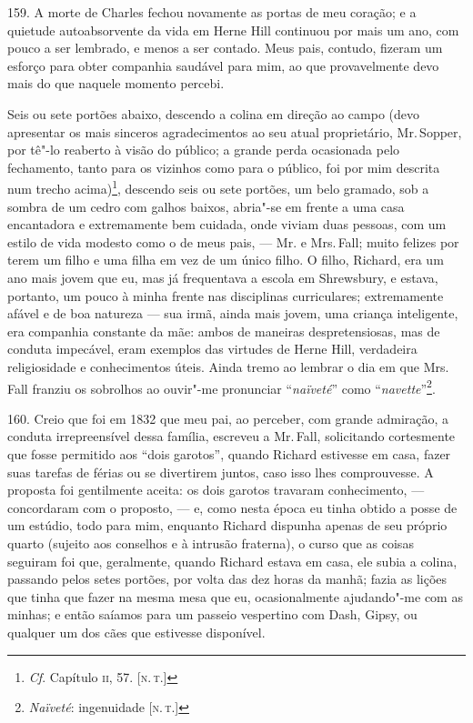 159. A morte de Charles fechou novamente as portas de meu coração; e a
quietude autoabsorvente da vida em Herne Hill continuou por mais um ano,
com pouco a ser lembrado, e menos a ser contado. Meus pais, contudo,
fizeram um esforço para obter companhia saudável para mim, ao que
provavelmente devo mais do que naquele momento percebi.

Seis ou sete portões abaixo, descendo a colina em direção ao campo (devo
apresentar os mais sinceros agradecimentos ao seu atual proprietário, Mr.\,Sopper, por tê"-lo reaberto à visão do público; a grande perda ocasionada
pelo fechamento, tanto para os vizinhos como para o público, foi por mim
descrita num trecho acima)\footnote{\emph{Cf}. Capítulo \textsc{ii}, 57. {[}\textsc{n.\,t.}{]}}, descendo seis ou sete portões, um belo gramado, sob a sombra
de um cedro com galhos baixos, abria"-se em frente a uma casa encantadora
e extremamente bem cuidada, onde viviam duas pessoas, com um estilo de
vida modesto como o de meus pais, --- Mr. e Mrs.\,Fall; muito felizes por
terem um filho e uma filha em vez de um único filho. O filho, Richard,
era um ano mais jovem que eu, mas já frequentava a escola em Shrewsbury,
e estava, portanto, um pouco à minha frente nas disciplinas
curriculares; extremamente afável e de boa natureza --- sua irmã, ainda
mais jovem, uma criança inteligente, era companhia constante da mãe:
ambos de maneiras despretensiosas, mas de conduta impecável, eram
exemplos das virtudes de Herne Hill, verdadeira religiosidade e
conhecimentos úteis. Ainda tremo ao lembrar o dia em que Mrs.\,Fall
franziu os sobrolhos ao ouvir"-me pronunciar ``\emph{naïveté}'' como
``\emph{navette}''\footnote{\emph{Naïveté}: ingenuidade {[}\textsc{n.\,t.}{]}}.

160. Creio que foi em 1832 que meu pai, ao perceber, com grande
admiração, a conduta irrepreensível dessa família, escreveu a Mr.\,Fall,
solicitando cortesmente que fosse permitido aos ``dois garotos'', quando
Richard estivesse em casa, fazer suas tarefas de férias ou se divertirem
juntos, caso isso lhes comprouvesse. A proposta foi gentilmente aceita:
os dois garotos travaram conhecimento, --- concordaram com o proposto, ---
e, como nesta época eu tinha obtido a posse de um estúdio, todo para
mim, enquanto Richard dispunha apenas de seu próprio quarto (sujeito aos
conselhos e à intrusão fraterna), o curso que as coisas seguiram foi
que, geralmente, quando Richard estava em casa, ele subia a colina,
passando pelos setes portões, por volta das dez horas da manhã; fazia as
lições que tinha que fazer na mesma mesa que eu, ocasionalmente
ajudando"-me com as minhas; e então saíamos para um passeio vespertino
com Dash, Gipsy, ou qualquer um dos cães que estivesse disponível.

